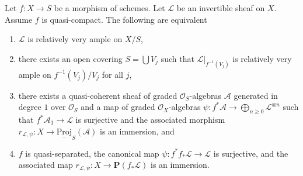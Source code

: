 \begin{lemma}
\label{lemma-relatively-very-ample}
Let $f : X \to S$ be a morphism of schemes.
Let $\mathcal{L}$ be an invertible sheaf on $X$.
Assume $f$ is quasi-compact. The following are
equivalent
\begin{enumerate}
\item $\mathcal{L}$ is relatively very ample on $X/S$,
\item there exists an open covering $S = \bigcup V_j$ such
that $\mathcal{L}|_{f^{-1}(V_j)}$ is relatively very ample
on $f^{-1}(V_j)/V_j$ for all $j$,
\item there exists a quasi-coherent sheaf of graded
$\mathcal{O}_S$-algebras $\mathcal{A}$ generated in degree
$1$ over $\mathcal{O}_S$ and a map of graded $\mathcal{O}_X$-algebras
$\psi : f^*\mathcal{A} \to \bigoplus_{n \geq 0} \mathcal{L}^{\otimes n}$
such that $f^*\mathcal{A}_1 \to \mathcal{L}$ is surjective and the
associated morphism
$r_{\mathcal{L}, \psi} : X \to \underline{\text{Proj}}_S(\mathcal{A})$
is an immersion, and
\item $f$ is quasi-separated, the canonical map
$\psi : f^*f_*\mathcal{L} \to \mathcal{L}$ is surjective, and
the associated map $r_{\mathcal{L}, \psi} : X \to \mathbf{P}(f_*\mathcal{L})$
is an immersion.
\end{enumerate}
\end{lemma}

